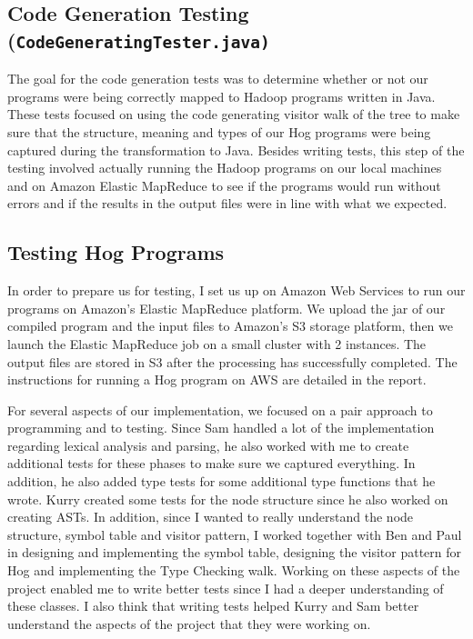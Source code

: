 \documentclass{report}
\begin{document}
\subsection*{Code Generation Testing (\tt CodeGeneratingTester.java\rm)}

The goal for the code generation tests was to determine whether or not our programs were being correctly mapped to Hadoop programs written in Java. These tests focused on using the code generating visitor walk of the tree to make sure that the structure, meaning and types of our Hog programs were being captured during the transformation to Java. Besides writing tests, this step of the testing involved actually running the Hadoop programs on our local machines and on Amazon Elastic MapReduce to see if the programs would run without errors and if the results in the output files were in line with what we expected.

\subsection*{Testing Hog Programs}

In order to prepare us for testing, I set us up on Amazon Web Services to run our programs on Amazon’s Elastic MapReduce platform. We upload the jar of our compiled program and the input files to Amazon’s S3 storage platform, then we launch the Elastic MapReduce job on a small cluster with 2 instances. The output files are stored in S3 after the processing has successfully completed. The instructions for running a Hog program on AWS are detailed in the report.

For several aspects of our implementation, we focused on a pair approach to programming and to testing. Since Sam handled a lot of the implementation regarding lexical analysis and parsing, he also worked with me to create additional tests for these phases to make sure we captured everything. In addition, he also added type tests for some additional type functions that he wrote. Kurry created some tests for the node structure since he also worked on creating ASTs. In addition, since I wanted to really understand the node structure, symbol table and visitor pattern, I worked together with Ben and Paul in designing and implementing the symbol table, designing the visitor pattern for Hog and implementing the Type Checking walk. Working on these aspects of the project enabled me to write better tests since I had a deeper understanding of these classes. I also think that writing tests helped Kurry and Sam better understand the aspects of the project that they were working on. 
\end{document}
